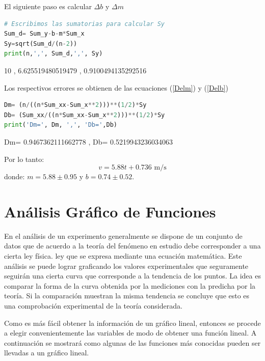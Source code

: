 El siguiente paso es calcular $\Delta b$ y $\Delta m$

\begin{lstlisting}[language=Python] 
# Escribimos las sumatorias para calcular Sy
Sum_d= Sum_y-b-m*Sum_x
Sy=sqrt(Sum_d/(n-2))
print(n,',', Sum_d,',', Sy)
\end{lstlisting}
\begin{tcolorbox}[width=\textwidth,colback={ghostwhite}]   
{\small 
10 , 6.625519480519479 , 0.9100494135292516
}
\end{tcolorbox}

Los respectivos errores se obtienen de las ecuaciones (\ref{Delm}) y (\ref{Delb}) 

\begin{lstlisting}[language=Python] 
Dm= (n/((n*Sum_xx-Sum_x**2)))**(1/2)*Sy
Db= (Sum_xx/((n*Sum_xx-Sum_x**2)))**(1/2)*Sy
print('Dm=', Dm, ',', 'Db=',Db)
\end{lstlisting}
\begin{tcolorbox}[width=\textwidth,colback={ghostwhite}]   
{\small 
Dm= 0.9467362111662778 , Db= 0.5219943236034063
}
\end{tcolorbox}

Por lo tanto:
$$
v= 5.88 t + 0.736 \,\, \mathrm{m/s}
$$
donde: $m=5.88 \pm 0.95$ y $b=0.74 \pm 0.52$.



\section{An\'alisis Gr\'afico de Funciones}
En el an\'alisis de un experimento generalmente se dispone de un conjunto de datos que de acuerdo a la teor\'ia del fen\'omeno en estudio debe corresponder a una cierta ley f\'isica. ley  que se expresa mediante una ecuaci\'on matem\'atica.  Este an\'alisis se puede lograr graficando los valores experimentales que seguramente seguir\'an una cierta curva que corresponde a la tendencia de los puntos.  La idea es comparar la forma de la curva obtenida por la mediciones con la predicha por la teor\'ia. Si la comparaci\'on muestran la misma tendencia se concluye que esto es una comprobaci\'on experimental de la teor\'ia considerada.

Como es m\'as f\'acil obtener la informaci\'on de un gr\'afico lineal, entonces se procede a elegir convenientemente las variables de modo de obtener una funci\'on lineal. A continuaci\'on se mostrar\'a como algunas de las funciones m\'as conocidas pueden ser llevadas a un gr\'afico lineal.

